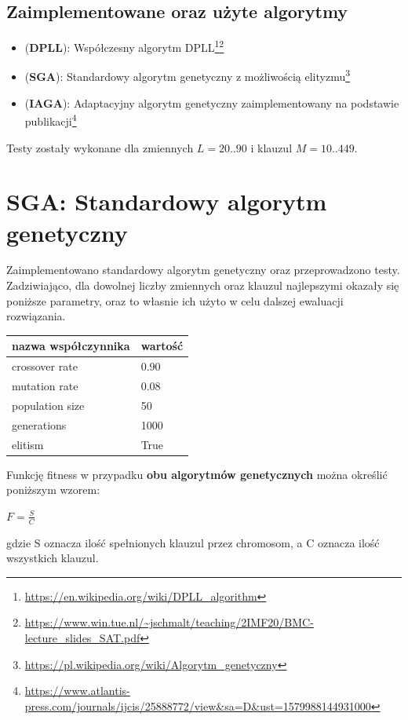 \documentclass[10pt]{article}
\begin{document}
\subsection{Zaimplementowane oraz użyte algorytmy}
\begin{itemize}
  \item (\textbf{DPLL}): Współczesny algorytm DPLL\footnote{\url{https://en.wikipedia.org/wiki/DPLL_algorithm}}\footnote{\url{https://www.win.tue.nl/~jschmalt/teaching/2IMF20/BMC-lecture_slides_SAT.pdf}}
  \item (\textbf{SGA}): Standardowy algorytm genetyczny z możliwością elityzmu\footnote{\url{https://pl.wikipedia.org/wiki/Algorytm_genetyczny}}
	\item (\textbf{IAGA}): Adaptacyjny algorytm genetyczny zaimplementowany na podstawie publikacji\footnote{\url{https://www.atlantis-press.com/journals/ijcis/25888772/view&sa=D&ust=1579988144931000}}
\end{itemize}
Testy zostały wykonane dla zmiennych $L=20 .. 90$ i klauzul $M=10 .. 449$.\\
\section{\textbf{SGA}: Standardowy algorytm genetyczny}
Zaimplementowano standardowy algorytm genetyczny oraz przeprowadzono testy. Zadziwiająco, dla dowolnej liczby zmiennych oraz klauzul najlepszymi okazały się poniższe parametry, oraz to własnie ich użyto w celu dalszej ewaluacji rozwiązania.

\begin{center}
		\begin{tabular}{|C{5cm}|C{5cm}|}
			\hline
			\textbf{nazwa współczynnika} & \textbf{wartość} \\ \hline
			{crossover rate} & 0.90\\ \hline
			{mutation rate} & 0.08\\  \hline
      {population size} & 50 \\ \hline
      {generations} & 1000 \\ \hline
      {elitism} & True \\ \hline
		\end{tabular}
\end{center}

Funkcję fitness w przypadku \textbf{obu algorytmów genetycznych} można określić poniższym wzorem:
\begin{center}
  $F = \frac{S}{C}$
\end{center}
gdzie S oznacza ilość spełnionych klauzul przez chromosom, a C oznacza ilość wszystkich klauzul.
\end{document}
